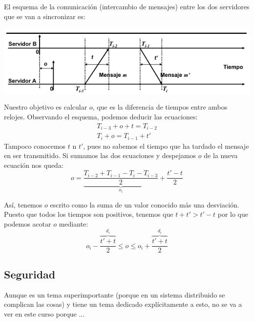 \begin{example}
El esquema de la comunicación (intercambio de mensajes) entre los dos servidores que se van a sincronizar es:
\begin{center}
\includegraphics[width=1\textwidth]{img/ntp.png}
\end{center}

Nuestro objetivo es calcular $o$, que es la diferencia de tiempos entre ambos relojes. Observando el esquema, podemos deducir las ecuaciones:
\begin{align}
T_{i-3}+o+t=T_{i-2}\\
T_{i}+o=T_{i-1}+t'
\end{align}
Tampoco conocemos $t$ n $t'$, pues no sabemos el tiempo que ha tardado el mensaje en ser transmitido. Si sumamos las dos ecuaciones y despejamos $o$ de la nueva ecuación nos queda:
\[o=\underbrace{\frac{T_{i-2}+T_{i-1}-T_i-T_{i-3}}{2}}_{o_i}+\frac{t'-t}{2}\]

Así, tenemos $o$ escrito como la suma de un valor conocido más una desviación. Puesto que todos los tiempos son positivos, tenemos que $t+t'>t'-t$ por lo que podemos acotar $o$ mediante:
\[o_i-\frac{\overbrace{t'+t}^{d_i}}{2}\leq o \leq o_i + \frac{\overbrace{t'+t}^{d_i}}{2}\]
\end{example}

\subsection{Seguridad}
Aunque es un tema superimportante (porque en un sistema distribuido se complican las cosas) y tiene un tema dedicado explícitamente a esto, no se va a ver en este curso porque ...

